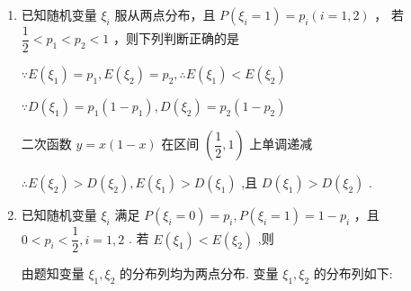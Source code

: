 \begin{enumerate}
\begin{enumerate}
\begin{jieda}
            又因 $P\left( {X = 0}\right)  < P\left( {X = 1}\right)$，所以 $P\left( {X = 1}\right)  = \dfrac{2}{3}$ ,则 $P\left( {X = 0}\right)  = \dfrac{1}{3}$，所以 $E\left( X\right)  = \dfrac{2}{3}$
        \end{jieda}
        
        \item 已知随机变量 ${\xi }_{i}$ 服从两点分布，且 $P\left( {{\xi }_{i} = 1}\right)  = {p}_{i}\left( {i = 1,2}\right)$ ， 若 $\dfrac{1}{2} < {p}_{1} < {p}_{2} < 1$ ，则下列判断正确的是
        \begin{jieda}
            $\because E\left( {\xi }_{1}\right)  = {p}_{1},E\left( {\xi }_{2}\right)  = {p}_{2},\therefore E\left( {\xi }_{1}\right)  < E\left( {\xi }_{2}\right)$

            $\because D\left( {\xi }_{1}\right)  = {p}_{1}\left( {1 - {p}_{1}}\right) ,D\left( {\xi }_{2}\right)  = {p}_{2}\left( {1 - {p}_{2}}\right)$
            
            二次函数 $y = x\left( {1 - x}\right)$ 在区间 $\left( {\dfrac{1}{2},1}\right)$ 上单调递减
            
            $\therefore E\left( {\xi }_{2}\right)  > D\left( {\xi }_{2}\right) ,E\left( {\xi }_{1}\right)  > D\left( {\xi }_{1}\right)$ ,且 $D\left( {\xi }_{1}\right)  > D\left( {\xi }_{2}\right)$ .
        \end{jieda}
        
        \item 已知随机变量 ${\xi }_{i}$ 满足 $P\left( {{\xi }_{i} = 0}\right)  = {p}_{i},P\left( {{\xi }_{i} = 1}\right)  = 1 - {p}_{i}$ ，且 $0 < {p}_{i} < \dfrac{1}{2},i = 1,2$ . 若 $E\left( {\xi }_{1}\right)  < E\left( {\xi }_{2}\right)$ ,则
        \begin{jieda}
            由题知变量 ${\xi }_{1},{\xi }_{2}$ 的分布列均为两点分布. 变量 ${\xi }_{1},{\xi }_{2}$ 的分布列如下:
            

\end{jieda}
\end{enumerate}
\end{enumerate}
